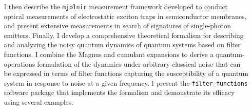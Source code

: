 \documentclass[a4paper,10pt]{article}
\begin{document}
I then describe the \texttt{mjolnir} measurement framework developed to conduct optical measurements of electrostatic exciton traps in semiconductor membranes, and present extensive measurements in search of signatures of single-photon emitters.
Finally, I develop a comprehensive theoretical formalism for describing and analyzing the noisy quantum dynamics of quantum systems based on filter functions.
I combine the Magnus and cumulant expansions to derive a quantum-operations formulation of the dynamics under arbitrary classical noise that can be expressed in terms of filter functions capturing the susceptibility of a quantum system in response to noise at a given frequency.
I present the \texttt{filter\_functions} software package that implements the formalism and demonstrate its efficacy using several examples.

\clearpage
\end{document}
